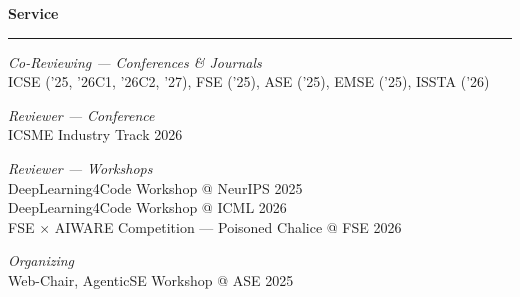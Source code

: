 \documentclass[11pt,letterpaper]{article}
\newcommand{\cvsection}[1]{%
  \vspace{14pt}%
  {\large\textbf{#1}}\\[-5pt]%
  \rule{\linewidth}{0.4pt}%
  \vspace{4pt}%
}
\begin{document}
\cvsection{Service}

\textit{Co-Reviewing --- Conferences \& Journals}\\[2pt]
\hspace*{12pt} ICSE ('25, '26C1, '26C2, '27), FSE ('25), ASE ('25), EMSE ('25), ISSTA ('26)

\vspace{6pt}
\textit{Reviewer --- Conference}\\[2pt]
\hspace*{12pt} ICSME Industry Track 2026

\vspace{6pt}
\textit{Reviewer --- Workshops}\\[2pt]
\hspace*{12pt} DeepLearning4Code Workshop @ NeurIPS 2025\\[1pt]
\hspace*{12pt} DeepLearning4Code Workshop @ ICML 2026\\[1pt]
\hspace*{12pt} FSE $\times$ AIWARE Competition --- Poisoned Chalice @ FSE 2026

\vspace{6pt}
\textit{Organizing}\\[2pt]
\hspace*{12pt} Web-Chair, AgenticSE Workshop @ ASE 2025

\end{document}
